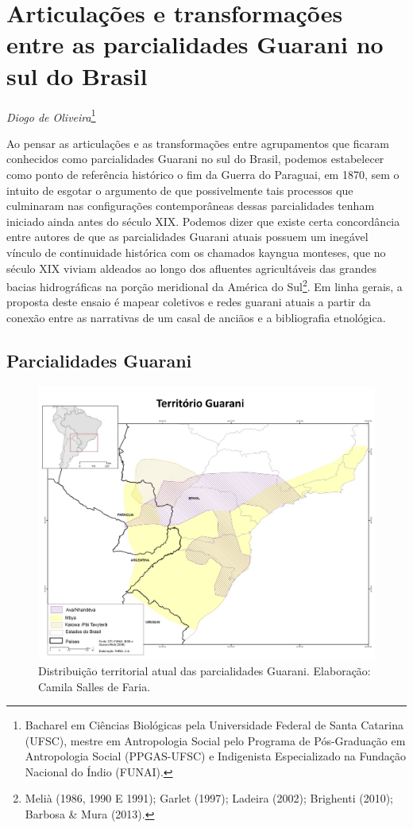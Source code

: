 \chapter{Articulações e transformações entre as parcialidades Guarani no sul do
Brasil}
\begin{flushright}
\emph{Diogo de Oliveira}\footnote{Bacharel em Ciências Biológicas pela Universidade Federal de Santa Catarina (UFSC),
mestre em Antropologia Social pelo Programa de Pós-Graduação em Antropologia Social (PPGAS-UFSC) e Indigenista
Especializado na Fundação Nacional do Índio (FUNAI).}
\end{flushright}

Ao pensar as articulações e as transformações entre agrupamentos que
ficaram conhecidos como parcialidades Guarani no sul do Brasil, podemos
estabelecer como ponto de referência histórico o fim da Guerra do
Paraguai, em 1870, sem o intuito de esgotar o argumento de que
possivelmente tais processos que culminaram nas configurações
contemporâneas dessas parcialidades tenham iniciado ainda antes do
século XIX. Podemos dizer que existe certa concordância entre autores
de que as parcialidades Guarani atuais possuem um inegável vínculo de
continuidade histórica com os chamados kayngua monteses, que no século
XIX viviam aldeados ao longo dos afluentes agricultáveis das grandes
bacias hidrográficas na porção meridional da América do
Sul\footnote{Melià (1986, 1990 E 1991); Garlet (1997); Ladeira (2002);
Brighenti (2010); Barbosa \& Mura (2013).}. Em linha gerais, a proposta
deste ensaio é mapear coletivos e redes guarani atuais a partir da
conexão entre as narrativas de um casal de anciãos e a bibliografia
etnológica. 

\section{Parcialidades Guarani}

\begin{figure}
  \centering
 \includegraphics[width=\textwidth]{./img/GUARANIS-img7.jpg}	
  \hfill
  \caption{Distribuição territorial atual das parcialidades Guarani. Elaboração: Camila Salles de Faria.}
\end{figure}

